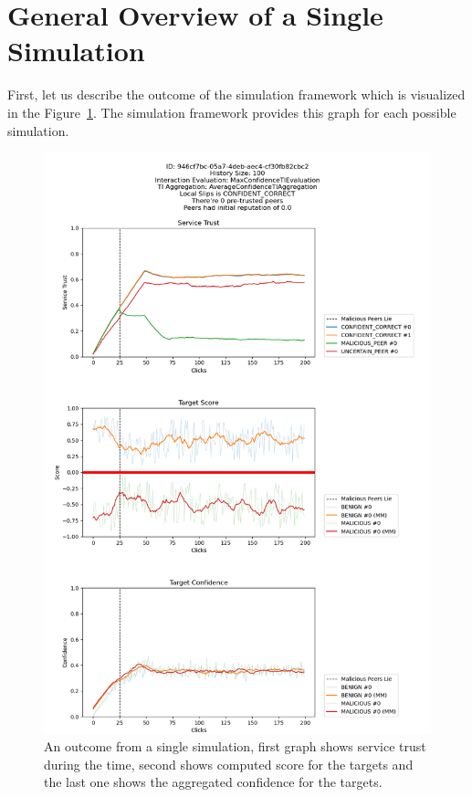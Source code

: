 \section{General Overview of a Single Simulation}
\label{sec:general-overview-of-simulation-output}
First, let us describe the outcome of the simulation framework which is visualized in the Figure~\ref{fig:single-simulation-example}.
The simulation framework provides this graph for each possible simulation.

\begin{figure}
    \centering
    \includegraphics[width=1.0\textwidth]{assets/example_evaluation.png}
    \caption{An outcome from a single simulation, first graph shows service trust during the time, second shows computed score for the targets and the last one shows the aggregated confidence for the targets.}
    \label{fig:single-simulation-example}
\end{figure}

